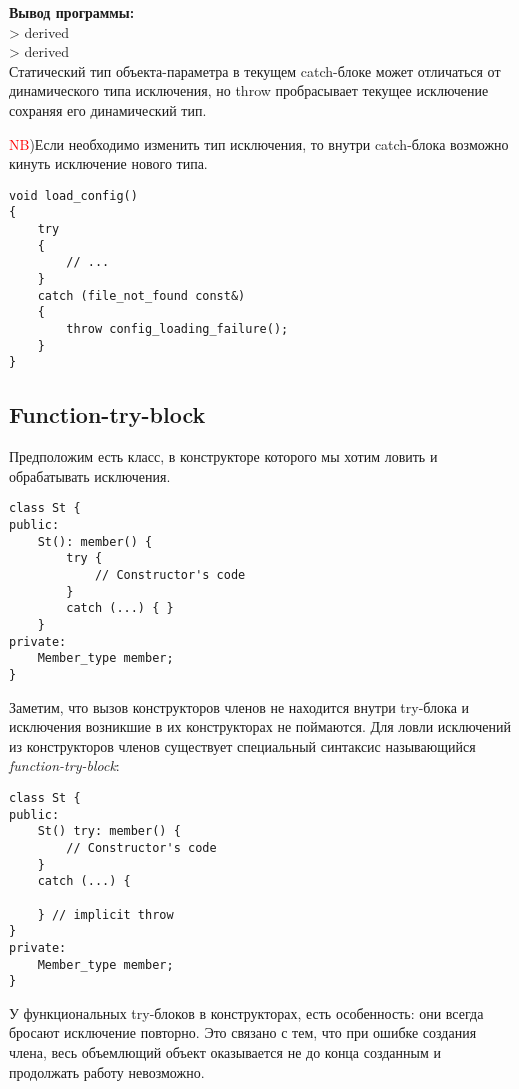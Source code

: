 \textbf{Вывод программы:} \\
> derived \\
> derived \\

Статический тип объекта-параметра в текущем catch-блоке может отличаться от динамического типа исключения, но throw пробрасывает текущее исключение сохраняя его динамический тип.

\textcolor{red}{NB})Если необходимо изменить тип исключения, то внутри catch-блока возможно кинуть исключение нового типа.

\begin{verbatim}
void load_config()
{
    try
    {
        // ...
    }
    catch (file_not_found const&)
    {
        throw config_loading_failure();
    }
}
\end{verbatim}

\subsection{Function-try-block}

Предположим есть класс, в конструкторе которого мы хотим ловить и обрабатывать исключения.
\begin{verbatim}
class St {
public:
    St(): member() {
        try {
            // Constructor's code
        }
        catch (...) { }
    }
private:
    Member_type member;
}
\end{verbatim}

Заметим, что вызов конструкторов членов не находится внутри try-блока и исключения возникшие в их конструкторах не поймаются. Для ловли исключений из конструкторов членов существует специальный синтаксис называющийся {\it function-try-block}:

\begin{verbatim}
class St {
public:
    St() try: member() {
        // Constructor's code
    }
    catch (...) {

    } // implicit throw
}
private:
    Member_type member;
}
\end{verbatim}

У функциональных try-блоков в конструкторах, есть особенность: они всегда бросают исключение повторно. Это связано с тем, что при ошибке создания члена, весь объемлющий объект оказывается не до конца созданным и продолжать работу невозможно.

